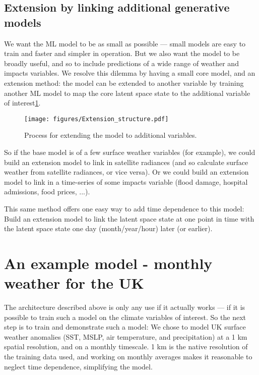 \documentclass[gmd]{copernicus}
\begin{document}
\subsection{Extension by linking additional generative models}
\label{extension}

We want the ML model to be as small as possible --- small models are easy to train and faster and simpler in operation. But we also want the model to be broadly useful, and so to include predictions of a wide range of weather and impacts variables. We resolve this dilemma by having a small core model, and an extension method: the model can be extended to another variable by training another ML model to map the core latent space state to the additional variable of interest\ref{Extension_structure}.

\begin{figure}[h]
\texttt{[image: figures/Extension\_structure.pdf]}
\caption{Process for extending the model to additional variables.}
\label{Extension_structure}
\end{figure}
     
So if the base model is of a few surface weather variables (for example), we could build an extension model to link in satellite radiances (and so calculate surface weather from satellite radiances, or vice versa). Or we could build an extension model to link in a time-series of some impacts variable (flood damage, hospital admissions, food prices, ...). 

This same method offers one easy way to add time dependence to this model: Build an extension model to link the latent space state at one point in time with the latent space state one day (month/year/hour) later (or earlier).


\section{An example model - monthly weather for the UK}

The architecture described above is only any use if it actually works --- if it is possible to train such a model on the climate variables of interest. So the next step is to train and demonstrate such a model: We chose to model UK surface weather anomalies (SST, MSLP, air temperature, and precipitation) at a 1 km spatial resolution, and on a monthly timescale. 1 km is the native resolution of the training data used, and working on monthly averages makes it reasonable to neglect time dependence, simplifying the model.
\end{document}
